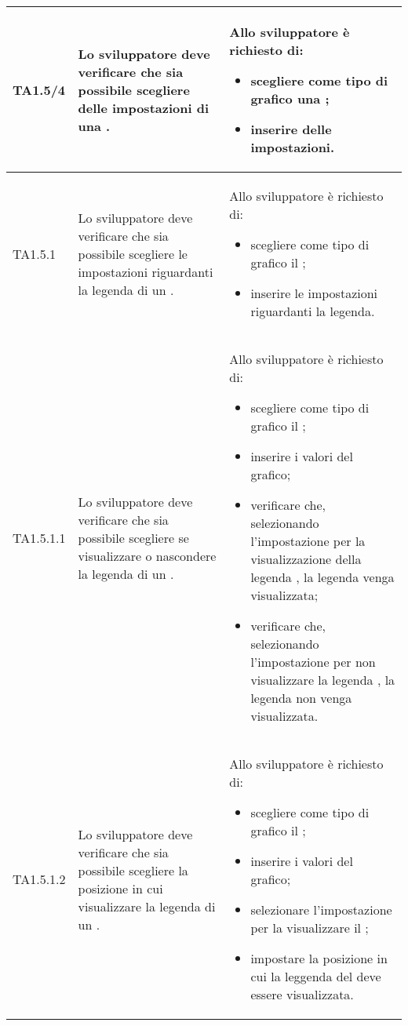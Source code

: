 \begin{longtabu}{| X[0.5] | X | X |}
	TA1.5/4 & Lo sviluppatore deve verificare che sia possibile scegliere delle impostazioni di una .

		& Allo sviluppatore è richiesto di:
		\begin{itemize}
			\item scegliere come tipo di grafico una ;
			\item inserire delle impostazioni.
		\end{itemize}
\\ \hline

	TA1.5.1 & Lo sviluppatore deve verificare che sia possibile scegliere le impostazioni riguardanti la legenda di un .

		& Allo sviluppatore è richiesto di:
		\begin{itemize}
			\item scegliere come tipo di grafico il ;
			\item inserire le impostazioni riguardanti la legenda.
		\end{itemize}
\\ \hline

	TA1.5.1.1 & Lo sviluppatore deve verificare che sia possibile scegliere se visualizzare o nascondere la legenda di un .
			
		& Allo sviluppatore è richiesto di:
		\begin{itemize}
			\item scegliere come tipo di grafico il ;
			\item inserire i valori del grafico;
			\item verificare che, selezionando l'impostazione per la visualizzazione della legenda , la legenda venga visualizzata;
			\item verificare che, selezionando l'impostazione per non visualizzare la legenda , la legenda non venga visualizzata.
		\end{itemize}
\\ \hline

	TA1.5.1.2 & Lo sviluppatore deve verificare che sia possibile scegliere la posizione in cui visualizzare la legenda di un .
			
		& Allo sviluppatore è richiesto di:
		\begin{itemize}
			\item scegliere come tipo di grafico il ;
			\item inserire i valori del grafico;
			\item selezionare l'impostazione per la visualizzare il ;
			\item impostare la posizione in cui la leggenda del  deve essere visualizzata.


\end{itemize}
\end{longtabu}
